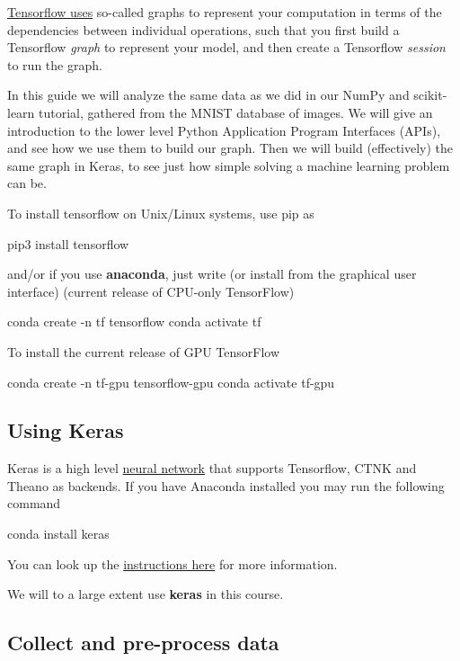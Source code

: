 \documentclass[%
oneside,                 %
final,                   %
10pt]{article}
\begin{document}
\href{{https://www.tensorflow.org/guide/graphs}}{Tensorflow uses} so-called graphs to represent your computation
in terms of the dependencies between individual operations, such that you first build a Tensorflow \emph{graph}
to represent your model, and then create a Tensorflow \emph{session} to run the graph.

In this guide we will analyze the same data as we did in our NumPy and
scikit-learn tutorial, gathered from the MNIST database of images. We
will give an introduction to the lower level Python Application
Program Interfaces (APIs), and see how we use them to build our graph.
Then we will build (effectively) the same graph in Keras, to see just
how simple solving a machine learning problem can be.

To install tensorflow on Unix/Linux systems, use pip as


\bpycod
pip3 install tensorflow

\epycod

and/or if you use \textbf{anaconda}, just write (or install from the graphical user interface)
(current release of CPU-only TensorFlow)



\bpycod
conda create -n tf tensorflow
conda activate tf

\epycod

To install the current release of GPU TensorFlow



\bpycod
conda create -n tf-gpu tensorflow-gpu
conda activate tf-gpu

\epycod


\subsection{Using Keras}

Keras is a high level \href{{https://en.wikipedia.org/wiki/Application_programming_interface}}{neural network}
that supports Tensorflow, CTNK and Theano as backends.  
If you have Anaconda installed you may run the following command


\bpycod
conda install keras

\epycod

You can look up the \href{{https://keras.io/}}{instructions here} for more information.

We will to a large extent use \textbf{keras} in this course. 

\subsection{Collect and pre-process data}
\end{document}
